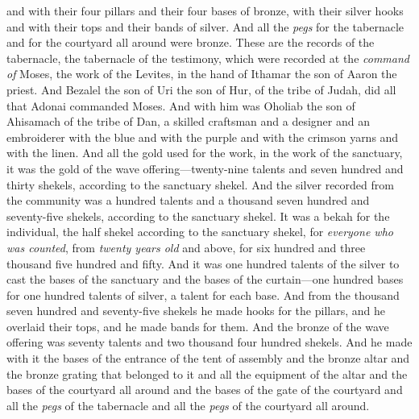 \begin{biblechapter}
\verse and with their four pillars and their four bases of bronze, with their silver hooks and with their tops and their bands of silver.
\verse And all the \textit{pegs} for the tabernacle and for the courtyard all around were bronze.
 These are the records of the tabernacle, the tabernacle of the testimony, which were recorded at the \textit{command of} Moses, the work of the Levites, in the hand of Ithamar the son of Aaron the priest.
\verse And Bezalel the son of Uri the son of Hur, of the tribe of Judah, did all that Adonai commanded Moses.
\verse And with him was Oholiab the son of Ahisamach of the tribe of Dan, a skilled craftsman and a designer and an embroiderer with the blue and with the purple and with the crimson yarns and with the linen.
\verse And all the gold used for the work, in the work of the sanctuary, it was the gold of the wave offering—twenty-nine talents and seven hundred and thirty shekels, according to the sanctuary shekel.
\verse And the silver recorded from the community was a hundred talents and a thousand seven hundred and seventy-five shekels, according to the sanctuary shekel.
\verse It was a bekah for the individual, the half shekel according to the sanctuary shekel, for \textit{everyone who was counted}, from \textit{twenty years old} and above, for six hundred and three thousand five hundred and fifty.
\verse And it was one hundred talents of the silver to cast the bases of the sanctuary and the bases of the curtain—one hundred bases for one hundred talents of silver, a talent for each base.
\verse And from the thousand seven hundred and seventy-five shekels he made hooks for the pillars, and he overlaid their tops, and he made bands for them.
\verse And the bronze of the wave offering was seventy talents and two thousand four hundred shekels.
\verse And he made with it the bases of the entrance of the tent of assembly and the bronze altar and the bronze grating that belonged to it and all the equipment of the altar
\verse and the bases of the courtyard all around and the bases of the gate of the courtyard and all the \textit{pegs} of the tabernacle and all the \textit{pegs} of the courtyard all around.
\end{biblechapter}


